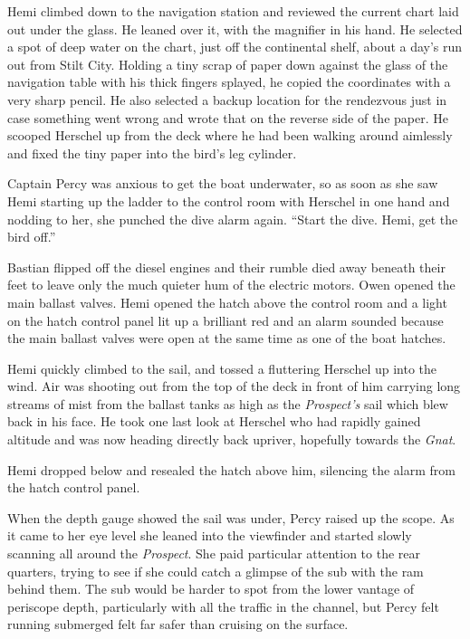 \documentclass[
]{scrbook}
\begin{document}
Hemi climbed down to the navigation station and reviewed the current
chart laid out under the glass. He leaned over it, with the magnifier in
his hand. He selected a spot of deep water on the chart, just off the
continental shelf, about a day's run out from Stilt City. Holding a tiny
scrap of paper down against the glass of the navigation table with his
thick fingers splayed, he copied the coordinates with a very sharp
pencil. He also selected a backup location for the rendezvous just in
case something went wrong and wrote that on the reverse side of the
paper. He scooped Herschel up from the deck where he had been walking
around aimlessly and fixed the tiny paper into the bird's leg cylinder.

Captain Percy was anxious to get the boat underwater, so as soon as she
saw Hemi starting up the ladder to the control room with Herschel in one
hand and nodding to her, she punched the dive alarm again. ``Start the
dive. Hemi, get the bird off.''

Bastian flipped off the diesel engines and their rumble died away
beneath their feet to leave only the much quieter hum of the electric
motors. Owen opened the main ballast valves. Hemi opened the hatch above
the control room and a light on the hatch control panel lit up a
brilliant red and an alarm sounded because the main ballast valves were
open at the same time as one of the boat hatches.

Hemi quickly climbed to the sail, and tossed a fluttering Herschel up
into the wind. Air was shooting out from the top of the deck in front of
him carrying long streams of mist from the ballast tanks as high as the
\emph{Prospect's} sail which blew back in his face. He took one last
look at Herschel who had rapidly gained altitude and was now heading
directly back upriver, hopefully towards the \emph{Gnat}.

Hemi dropped below and resealed the hatch above him, silencing the alarm
from the hatch control panel.

When the depth gauge showed the sail was under, Percy raised up the
scope. As it came to her eye level she leaned into the viewfinder and
started slowly scanning all around the \emph{Prospect}. She paid
particular attention to the rear quarters, trying to see if she could
catch a glimpse of the sub with the ram behind them. The sub would be
harder to spot from the lower vantage of periscope depth, particularly
with all the traffic in the channel, but Percy felt running submerged
felt far safer than cruising on the surface.
\end{document}
